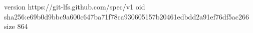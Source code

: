 version https://git-lfs.github.com/spec/v1
oid sha256:e69b0d9bbc9a600c647ba71f78ca930605157b20461edbdd2a91ef76df5ac266
size 864
